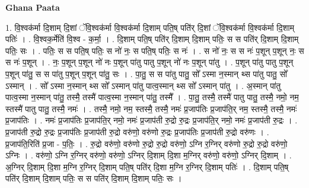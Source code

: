 \documentclass[17pt]{extarticle}
\begin{document}
\textbf{Ghana Paata } \newline

1. वि॒श्वक॑र्मा दि॒शाम् दि॒शां ॅवि॒श्वक॑र्मा वि॒श्वक॑र्मा दि॒शाम् पति॒ष् पति॑र् दि॒शां ॅवि॒श्वक॑र्मा वि॒श्वक॑र्मा दि॒शाम् पतिः॑ । . वि॒श्वक॒र्मेति॑ वि॒श्व - क॒र्मा॒ । . दि॒शाम् पति॒ष् पति॑र् दि॒शाम् दि॒शाम् पतिः॒ स स पति॑र् दि॒शाम् दि॒शाम् पतिः॒ सः । . पतिः॒ स स पति॒ष् पतिः॒ स नो॑ नः॒ स पति॒ष् पतिः॒ स नः॑ । . स नो॑ नः॒ स स नः॑ प॒शून् प॒शून् नः॒ स स नः॑ प॒शून् । . नः॒ प॒शून् प॒शून् नो॑ नः प॒शून् पा॑तु पातु प॒शून् नो॑ नः प॒शून् पा॑तु । . प॒शून् पा॑तु पातु प॒शून् प॒शून् पा॑तु॒ स स पा॑तु प॒शून् प॒शून् पा॑तु॒ सः । . पा॒तु॒ स स पा॑तु पातु॒ सो᳚ ऽस्मा न॒स्मान् थ्स पा॑तु पातु॒ सो᳚ ऽस्मान् । . सो᳚ ऽस्मा न॒स्मान् थ्स सो᳚ ऽस्मान् पा॑तु पात्व॒स्मान् थ्स सो᳚ ऽस्मान् पा॑तु । . अ॒स्मान् पा॑तु पात्व॒स्मा न॒स्मान् पा॑तु॒ तस्मै॒ तस्मै॑ पात्व॒स्मा न॒स्मान् पा॑तु॒ तस्मै᳚ । . पा॒तु॒ तस्मै॒ तस्मै॑ पातु पातु॒ तस्मै॒ नमो॒ नम॒ स्तस्मै॑ पातु पातु॒ तस्मै॒ नमः॑ । . तस्मै॒ नमो॒ नम॒ स्तस्मै॒ तस्मै॒ नमः॑ प्र॒जाप॑तिः प्र॒जाप॑ति॒र् नम॒ स्तस्मै॒ तस्मै॒ नमः॑ प्र॒जाप॑तिः । . नमः॑ प्र॒जाप॑तिः प्र॒जाप॑ति॒र् नमो॒ नमः॑ प्र॒जाप॑ती रु॒द्रो रु॒द्रः प्र॒जाप॑ति॒र् नमो॒ नमः॑ प्र॒जाप॑ती रु॒द्रः । . प्र॒जाप॑ती रु॒द्रो रु॒द्रः प्र॒जाप॑तिः प्र॒जाप॑ती रु॒द्रो वरु॑णो॒ वरु॑णो रु॒द्रः प्र॒जाप॑तिः प्र॒जाप॑ती रु॒द्रो वरु॑णः । . प्र॒जाप॑ति॒रिति॑ प्र॒जा - प॒तिः॒ । . रु॒द्रो वरु॑णो॒ वरु॑णो रु॒द्रो रु॒द्रो वरु॑णो॒ ऽग्नि र॒ग्निर् वरु॑णो रु॒द्रो रु॒द्रो वरु॑णो॒ ऽग्निः । . वरु॑णो॒ ऽग्नि र॒ग्निर् वरु॑णो॒ वरु॑णो॒ ऽग्निर् दि॒शाम् दि॒शा म॒ग्निर् वरु॑णो॒ वरु॑णो॒ ऽग्निर् दि॒शाम् । . अ॒ग्निर् दि॒शाम् दि॒शा म॒ग्नि र॒ग्निर् दि॒शाम् पति॒ष् पति॑र् दि॒शा म॒ग्नि र॒ग्निर् दि॒शाम् पतिः॑ । . दि॒शाम् पति॒ष् पति॑र् दि॒शाम् दि॒शाम् पतिः॒ स स पति॑र् दि॒शाम् दि॒शाम् पतिः॒ सः । \newline
\end{document}
